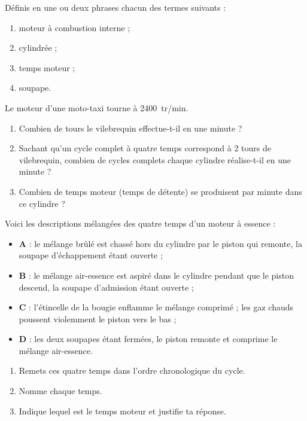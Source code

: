 \documentclass[11pt]{article}
\newcounter{popsec}
\newcounter{popsub}
\newcommand{\courssub}[1]{%
  \stepcounter{popsub}%
  \par\vspace{9pt}\noindent{\popxbold\fontsize{11.5}{13}\selectfont\color{popink}{\color{poporange}\thepopsec.\thepopsub}\hspace{6pt}#1}\par\nopagebreak\vspace{4pt}
}
\begin{document}
\begin{exercice}[Définitions]
Définis en une ou deux phrases chacun des termes suivants :
\begin{enumerate}
\item moteur à combustion interne ;
\item cylindrée ;
\item temps moteur ;
\item soupape.
\end{enumerate}
\end{exercice}

\begin{exercice}
Le moteur d'une moto-taxi tourne à \SI{2400}{tr/min}.
\begin{enumerate}
\item Combien de tours le vilebrequin effectue-t-il en une minute ?
\item Sachant qu'un cycle complet à quatre temps correspond à 2 tours de vilebrequin, combien de cycles complets chaque cylindre réalise-t-il en une minute ?
\item Combien de temps moteur (temps de détente) se produisent par minute dans ce cylindre ?
\end{enumerate}
\end{exercice}

\courssub{Je m'entraîne}

\begin{exercice}
Voici les descriptions mélangées des quatre temps d'un moteur à essence :
\begin{itemize}
\item \textbf{A} : le mélange brûlé est chassé hors du cylindre par le piston qui remonte, la soupape d'échappement étant ouverte ;
\item \textbf{B} : le mélange air-essence est aspiré dans le cylindre pendant que le piston descend, la soupape d'admission étant ouverte ;
\item \textbf{C} : l'étincelle de la bougie enflamme le mélange comprimé ; les gaz chauds poussent violemment le piston vers le bas ;
\item \textbf{D} : les deux soupapes étant fermées, le piston remonte et comprime le mélange air-essence.
\end{itemize}
\begin{enumerate}
\item Remets ces quatre temps dans l'ordre chronologique du cycle.
\item Nomme chaque temps.
\item Indique lequel est le temps moteur et justifie ta réponse.
\end{enumerate}
\end{exercice}
\end{document}
